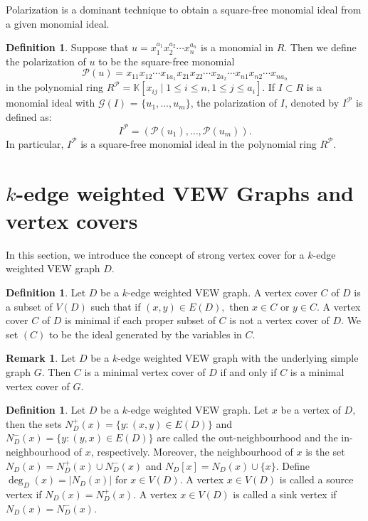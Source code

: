\documentclass[11pt,reqno]{amsart}
\theoremstyle{definition}
\newtheorem{remark}[theorem]{Remark}
\newtheorem{definition}[theorem]{Definition}
\begin{document}
Polarization is a dominant technique to obtain a square-free monomial ideal from a given monomial ideal.
\begin{definition}
	Suppose that  $u=x^{a_1}_1x_2^{a_2} \cdots x^{a_n}_n $ is a monomial in $R$. Then we define the polarization of $u$ to be the square-free monomial
	\begin{equation*}
		\mathcal{P} (u)  =  x_{11}x_{12} \cdots   x_{1a_1}x_{21}x_{22} \cdots x_{2a_2} \cdots  x_{n1}x_{n2} \cdots x_{na_n}
	\end{equation*}
	in the polynomial ring $R^\mathcal{P}=\mathbb{K}[x_{ij}  \mid  1  \leq  i  \leq  n, 1  \leq  j  \leq  a_i ]$. If  $ I \subset  R $ is a monomial
	ideal with $\mathcal{G}(I)$ = $ \{ u_1,\ldots, u_m   \}$, the polarization of $ I $, denoted by $I^\mathcal{P}$ is defined as:
	\begin{equation*}
		I^\mathcal{P} = (\mathcal{P} (u_1), \ldots ,\mathcal{P}(u_m)).\end{equation*}
In particular, $I^\mathcal{P}$ is a square-free monomial ideal in the polynomial ring $R^\mathcal{P}$.
\end{definition}

\section{$k$-edge weighted VEW Graphs and vertex covers} \label{sec3}
In this section, we introduce the concept of strong vertex cover for a $k$-edge weighted VEW graph $D$. 

\begin{definition}
Let $D$ be a $k$-edge weighted VEW graph.	A vertex cover $ C $ of $ D $ is a subset of $  V(D)  $ such that if $ (x, y) \in E(D) ,$ then
	$ x \in C $ or  $ y \in C . $ A vertex cover $ C $ of $ D $ is minimal if each proper subset of $ C $ is not a
	vertex cover of $ D. $ We set $(C)$ to be the ideal generated by the variables in $C.$
\end{definition}
\begin{remark}\label{s.v.00}
Let $D$ be a $k$-edge weighted VEW graph with the underlying simple graph $G$. Then $ C $ is a minimal vertex cover of $ D $ if and only if $ C $ is a minimal vertex cover of $ G. $
\end{remark}
\begin{definition}
Let $D$ be a $k$-edge weighted VEW graph.	Let $ x $ be a vertex of  $ D, $ then the sets $ N_D^+ (x) =	\{y : (x, y) \in E(D)\}  $ and  $ N_D^- (x) = \{y : (y, x) \in E(D)\}  $ are called the out-neighbourhood and the in-neighbourhood of $ x $, respectively. Moreover, the neighbourhood of $ x $ is the set $ N_D(x) = N_D^+ (x)\cup N_D^- (x)$ and $N_D[x]=N_D(x) \cup \{x\}$.  Define $\deg_D(x) = |N_D(x)|$ for  $ x \in V(D) $.  A vertex $ x \in V(D) $ is called a source vertex if $N_D (x)= N_D^+ (x) .$ 
	A vertex $ x \in V(D) $ is called a sink vertex if $N_D (x)= N_D^- (x) .$  
\end{definition}
\end{document}
